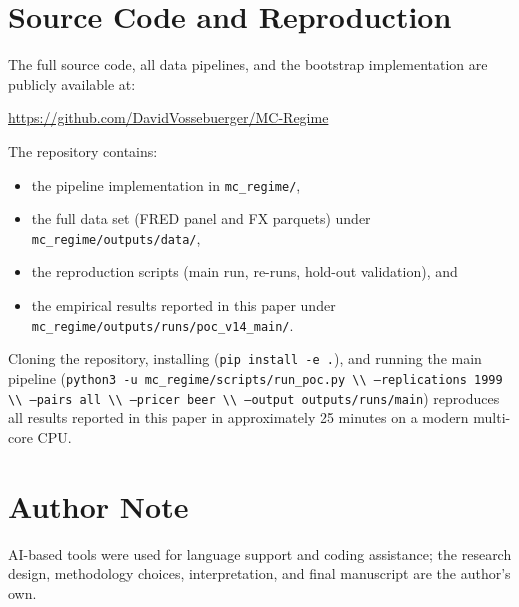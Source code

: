 \documentclass[11pt,a4paper]{article}
\theoremstyle{definition}
\begin{document}
\section{Source Code and Reproduction}

The full source code, all data pipelines, and the bootstrap
implementation are publicly available at:

\begin{center}
\url{https://github.com/DavidVossebuerger/MC-Regime}
\end{center}

The repository contains:
\begin{itemize}[leftmargin=2em]
  \item the pipeline implementation in \texttt{mc\_regime/},
  \item the full data set (FRED panel and FX parquets) under
        \texttt{mc\_regime/outputs/data/},
  \item the reproduction scripts (main run, re-runs, hold-out
        validation), and
  \item the empirical results reported in this paper under
        \texttt{mc\_regime/outputs/runs/poc\_v14\_main/}.
\end{itemize}

Cloning the repository, installing (\texttt{pip install -e .}), and
running the main pipeline (\texttt{python3 -u
mc\_regime/scripts/run\_poc.py \textbackslash\textbackslash
--replications 1999 \textbackslash\textbackslash
--pairs all \textbackslash\textbackslash
--pricer beer \textbackslash\textbackslash
--output outputs/runs/main}) reproduces all results reported
in this paper in approximately 25 minutes on a modern multi-core
CPU.

\section*{Author Note}

AI-based tools were used for language support and coding
assistance; the research design, methodology choices, interpretation,
and final manuscript are the author's own.
\end{document}
